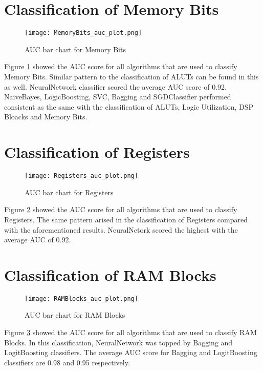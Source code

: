 \section{Classification of Memory Bits}
\begin{figure}[h!]
\centering
\texttt{[image: MemoryBits\_auc\_plot.png]}
\caption{AUC bar chart for Memory Bits}
\label{figure:MemoryBits_auc_plot}
\end{figure}

Figure \ref{figure:MemoryBits_auc_plot} showed the AUC score for all algorithms that are used to classify Memory Bits. Similar pattern to the classification of ALUTs can be found in this as well. NeuralNetwork classifier scored the average AUC score of 0.92. NaiveBayes, LogicBoosting, SVC, Bagging and SGDClassifier performed consistent as the same with the classification of ALUTs, Logic Utilization, DSP Bloacks and Memory Bits.

\section{Classification of Registers}
\begin{figure}[h!]
\centering
\texttt{[image: Registers\_auc\_plot.png]}
\caption{AUC bar chart for Registers}
\label{figure:Registers_auc_plot}
\end{figure}

Figure \ref{figure:Registers_auc_plot} showed the AUC score for all algorithms that are used to classify Registers. The same pattern arised in the classification of Registers compared with the aforementioned results. NeuralNetork scored the highest with the average AUC of 0.92.

\section{Classification of RAM Blocks}

\begin{figure}[h!]
\centering
\texttt{[image: RAMBlocks\_auc\_plot.png]}
\caption{AUC bar chart for RAM Blocks}
\label{figure:RAMBlocks_auc_plot}
\end{figure}

Figure \ref{figure:RAMBlocks_auc_plot} showed the AUC score for all algorithms that are used to classify RAM Blocks. In this classification, NeuralNetwork was topped by Bagging and LogitBoosting classifiers. The average AUC score for Bagging and LogitBoosting classifiers are 0.98 and 0.95 respectively.


